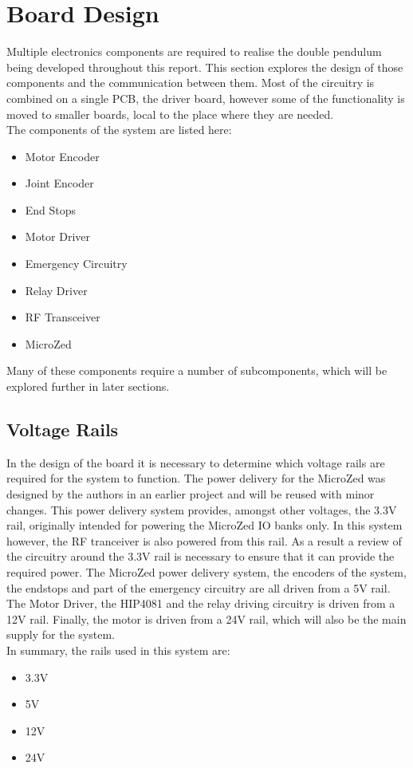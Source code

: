 \section{Board Design} %
\label{sec:board_design}
Multiple electronics components are required to realise the double pendulum being developed throughout this report.
This section explores the design of those components and the communication between them.
Most of the circuitry is combined on a single PCB, the driver board, however some of the functionality is moved to smaller boards, local to the place where they are needed.\\

The components of the system are listed here:
\begin{itemize}
	\item Motor Encoder
	\item Joint Encoder
	\item End Stops
	\item Motor Driver
	\item Emergency Circuitry
	\item Relay Driver
	\item RF Transceiver
	\item MicroZed 
\end{itemize}
Many of these components require a number of subcomponents, which will be explored further in later sections.

\subsection{Voltage Rails} %
\label{sub:voltage_rails}
In the design of the board it is necessary to determine which voltage rails are required for the system to function.
The power delivery for the MicroZed was designed by the authors in an earlier project \cite{isaswarm} and will be reused with minor changes.
This power delivery system provides, amongst other voltages, the 3.3V rail, originally intended for powering the MicroZed IO banks only.
In this system however, the RF tranceiver is also powered from this rail.
As a result a review of the circuitry around the 3.3V rail is necessary to ensure that it can provide the required power.
The MicroZed power delivery system, the encoders of the system, the endstops and part of the emergency circuitry are all driven from a 5V rail.
The Motor Driver, the HIP4081 and the relay driving circuitry is driven from a 12V rail.
Finally, the motor is driven from a 24V rail, which will also be the main supply for the system.\\
In summary, the rails used in this system are:
\begin{itemize}
	\item 3.3V
	\item 5V
	\item 12V
	\item 24V
\end{itemize}


